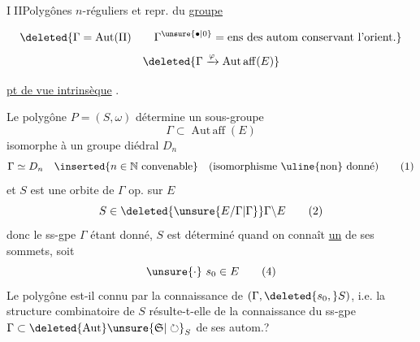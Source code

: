 \textcircled{III}\quad Polygônes $n$-réguliers et repr. du \uline{groupe} 

\[
\deleted{\Gamma=\operatorname{Aut}(\Pi)\qquad
\Gamma^{\unsure{\bullet|0}}=\text{ens des autom conservant l'orient.}}
\]
\[
\deleted{\Gamma\xrightarrow{\varphi}\operatorname{Aut\,aff}(E)}
\]

  \uline{pt de vue intrinsèque} .

Le polygône $P=(S,\omega)$ détermine un
sous-groupe
\[
\Gamma\subset\operatorname{Aut\,aff}(E)
\]
isomorphe à un groupe diédral $D_n$
\[
\Gamma\simeq D_n\quad \inserted{n\in\mathbb N\ \text{convenable}}\quad
\text{(isomorphisme \uline{non} donné)}\tag*{(1)}
\]
et $S$ est une orbite de $\Gamma$ op. sur $E$
\[
S\in\deleted{\unsure{E/\Gamma|\Gamma}}\Gamma\backslash E\tag*{(2)}
\]
donc le ss-gpe $\Gamma$ étant donné, 
$S$ est déterminé quand on connaît
\uline{un} de ses sommets, soit
\[
\unsure{\cdot}\ s_0\in E\tag*{(4)}
\]
 Le polygône  est-il connu
par la connaissance de $(\Gamma,\deleted{s_0,}S)$,
i.e. la structure combinatoire \inserted{$\omega$} de $S$
résulte-t-elle de la connaissance du
ss-gpe $\Gamma\subset\deleted{\operatorname{Aut}}\unsure{\mathfrak S|\circlearrowright}_S$ de ses autom.?

